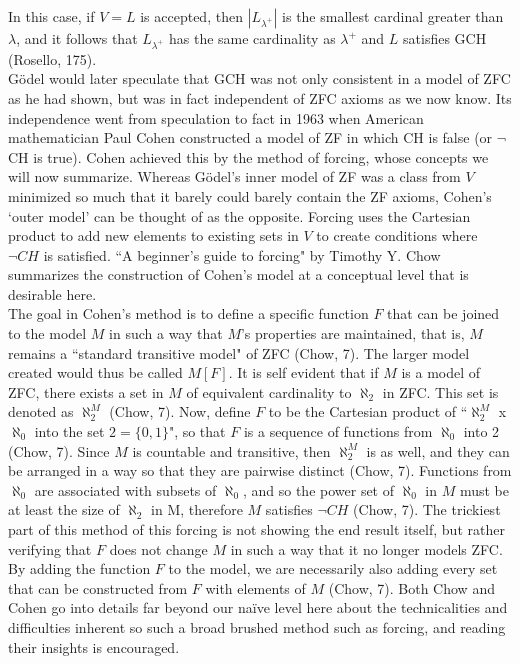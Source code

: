 \documentclass[10pt,letterpaper]{amsart}
\numberwithin{equation}{section}
\theoremstyle{plain}
\theoremstyle{definition}
\numberwithin{equation}{section}
\begin{document}
In this case, if $V=L$ is accepted, then $| L_{\lambda^+} |$ is the smallest cardinal greater than $\lambda$, and it follows that $L_{\lambda^+}$ has the same cardinality as $\lambda^+$ and $L$ satisfies GCH (Rosello, 175). \\

Gödel would later speculate that GCH was not only consistent in a model of ZFC as he had shown, but was in fact independent of ZFC axioms as we now know. Its independence went from speculation to fact in 1963 when American mathematician Paul Cohen constructed a model of ZF in which CH is false (or $\neg$CH is true). Cohen achieved this by the method of forcing, whose concepts we will now summarize. Whereas Gödel's inner model of ZF was a class from $V$ minimized so much that it barely could barely contain the ZF axioms, Cohen's `outer model' can be thought of as the opposite. Forcing uses the Cartesian product to add new elements to existing sets in $V$ to create conditions where $\neg CH$ is satisfied. ``A beginner's guide to forcing" by Timothy Y. Chow summarizes the construction of Cohen's model at a conceptual level that is desirable here. \\

The goal in Cohen's method is to define a specific function $F$ that can be joined to the model $M$ in such a way that $M$'s properties are maintained, that is, $M$ remains a ``standard transitive model" of ZFC (Chow, 7). The larger model created would thus be called $M[F]$. It is self evident that if $M$ is a model of ZFC, there exists a set in $M$ of equivalent cardinality to $\aleph_2$ in ZFC. This set is denoted as $\aleph_2^M$ (Chow, 7). Now, define $F$ to be the Cartesian product of ``$\aleph_2^M$ x $\aleph_0$ into the set $2=\{0,1\}$", so that $F$ is a sequence of functions from $\aleph_0$ into 2 (Chow, 7). Since $M$ is countable and transitive, then $\aleph_2^M$ is as well, and they can be arranged in a way so that they are pairwise distinct (Chow, 7). Functions from $\aleph_0$ are associated with subsets of $\aleph_0$, and so the power set of $\aleph_0$ in $M$ must be at least the size of $\aleph_2$ in M, therefore $M$ satisfies $\neg CH$ (Chow, 7). The trickiest part of this method of this forcing is not showing the end result itself, but rather verifying that $F$ does not change $M$ in such a way that it no longer models ZFC. By adding the function $F$  to the model, we are necessarily also adding every set that can be constructed from $F$ with elements of $M$ (Chow, 7). Both Chow and Cohen go into details far beyond our naïve level here about the technicalities and difficulties inherent so such a broad brushed method such as forcing, and reading their insights is encouraged. \\
\end{document}

